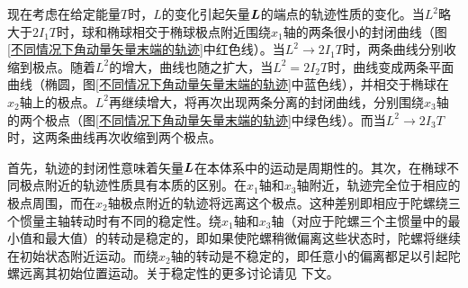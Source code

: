 现在考虑在给定能量$T$时，$L$的变化引起矢量$\boldsymbol{L}$的端点的轨迹性质的变化。当$L^2$略大于$2I_1T$时，球和椭球相交于椭球极点附近围绕$x_1$轴的两条很小的封闭曲线（图\ref{不同情况下角动量矢量末端的轨迹}中红色线）。当$L^2\to 2I_1T$时，两条曲线分别收缩到极点。随着$L^2$的增大，曲线也随之扩大，当$L^2=2I_2T$时，曲线变成两条平面曲线（椭圆，图\ref{不同情况下角动量矢量末端的轨迹}中蓝色线），并相交于椭球在$x_2$轴上的极点。$L^2$再继续增大，将再次出现两条分离的封闭曲线，分别围绕$x_3$轴的两个极点（图\ref{不同情况下角动量矢量末端的轨迹}中绿色线）。而当$L^2\to 2I_3T$时，这两条曲线再次收缩到两个极点。

首先，轨迹的封闭性意味着矢量$\boldsymbol{L}$在本体系中的运动是周期性的。其次，在椭球不同极点附近的轨迹性质具有本质的区别。在$x_1$轴和$x_3$轴附近，轨迹完全位于相应的极点周围，而在$x_2$轴极点附近的轨迹将远离这个极点。这种差别即相应于陀螺绕三个惯量主轴转动时有不同的稳定性。绕$x_1$轴和$x_3$轴（对应于陀螺三个主惯量中的最小值和最大值）的转动是稳定的，即如果使陀螺稍微偏离这些状态时，陀螺将继续在初始状态附近运动。而绕$x_2$轴的转动是不稳定的，即任意小的偏离都足以引起陀螺远离其初始位置运动。关于稳定性的更多讨论请见%
下文。

